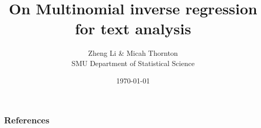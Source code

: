\documentclass[aspectratio=169]{beamer}
\title{On Multinomial inverse regression for text analysis \cite{tad13}}
\author{Zheng Li \& Micah Thornton \\ SMU Department of Statistical Science}
\date{\today}
\begin{document}
 

\begin{frame} 
	\maketitle{}
\end{frame} 

\begin{frame} 
	\frametitle{References} 
	 
	 
\end{frame} 
\end{document}
